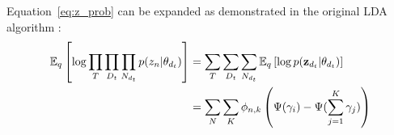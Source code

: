 Equation~\ref{eq:z_prob} can be expanded as demonstrated in
the original LDA algorithm \cite{blei:2003}:
\begin{align}
  \mathbb{E}_q\left[ \log \prod_T \prod_{D_t} \prod_{N_{d_t}} p(z_n | \theta_{d_t}) \right]
  & = \sum_T \sum_{D_t} \sum_{N_{d_t}} \mathbb{E}_q\left[ \log p( \bold{z}_{d_t} | \theta_{d_t} ) \right]  \\  \nonumber
  & = \sum_N \sum_K \phi_{n,k} \left( \Psi(\gamma_i) - \Psi(\sum_{j=1}^K \gamma_j ) \right) \nonumber
\end{align}


